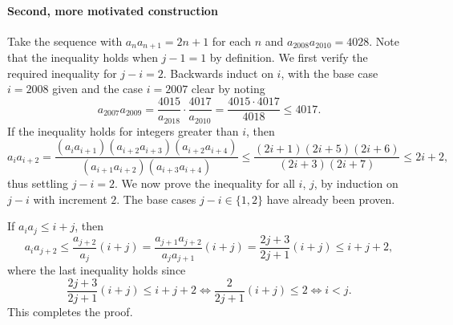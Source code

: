\paragraph{Second, more motivated construction}     Take the sequence with $a_na_{n+1}=2n+1$ for each $n$ and $a_{2008}a_{2010}=4028$. Note that the inequality holds when $j-1=1$ by definition. We first verify the required inequality for $j-i=2$. Backwards induct on $i$, with the base case $i=2008$ given and the case $i=2007$ clear by noting \[a_{2007}a_{2009}=\frac{4015}{a_{2018}}\cdot\frac{4017}{a_{2010}}=\frac{4015\cdot4017}{4018}\le4017.\]
If the inequality holds for integers greater than $i$, then \[a_ia_{i+2}=\frac{(a_ia_{i+1})(a_{i+2}a_{i+3})(a_{i+2}a_{i+4})}{(a_{i+1}a_{i+2})(a_{i+3}a_{i+4})}\le\frac{(2i+1)(2i+5)(2i+6)}{(2i+3)(2i+7)}\le2i+2,\]
thus settling $j-i=2$. We now prove the inequality for all $i$, $j$, by induction on $j-i$ with increment $2$. The base cases $j-i\in\{1,2\}$ have already been proven.

If $a_ia_j\le i+j$, then \[a_ia_{j+2}\le\frac{a_{j+2}}{a_j}(i+j)=\frac{a_{j+1}a_{j+2}}{a_ja_{j+1}}(i+j)=\frac{2j+3}{2j+1}(i+j)\le i+j+2,\]
where the last inequality holds since \[\frac{2j+3}{2j+1}(i+j)\le i+j+2\iff\frac2{2j+1}(i+j)\le 2\iff i<j.\]
This completes the proof.

